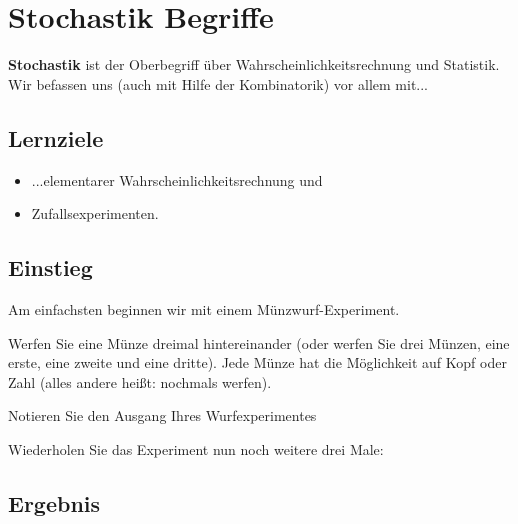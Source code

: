 
\section{Stochastik Begriffe}


\textbf{Stochastik} ist der Oberbegriff über
Wahrscheinlichkeitsrechnung und Statistik. Wir befassen
uns (auch mit Hilfe der Kombinatorik) vor allem mit...

\subsection*{Lernziele}
\begin{itemize}
	\item ...elementarer Wahrscheinlichkeitsrechnung und
	\item Zufallsexperimenten.
\end{itemize}


\subsection*{Einstieg}
Am einfachsten beginnen wir mit einem Münzwurf-Experiment.

Werfen Sie eine Münze dreimal hintereinander (oder werfen Sie drei
Münzen, eine erste, eine zweite und eine dritte). Jede Münze hat die
Möglichkeit auf Kopf oder Zahl (alles andere heißt: nochmals werfen).

Notieren Sie den Ausgang Ihres Wurfexperimentes


\TRAINER{\vspace{24mm}}

Wiederholen Sie das Experiment nun noch weitere drei Male:



\newpage



\subsection{Ergebnis}

